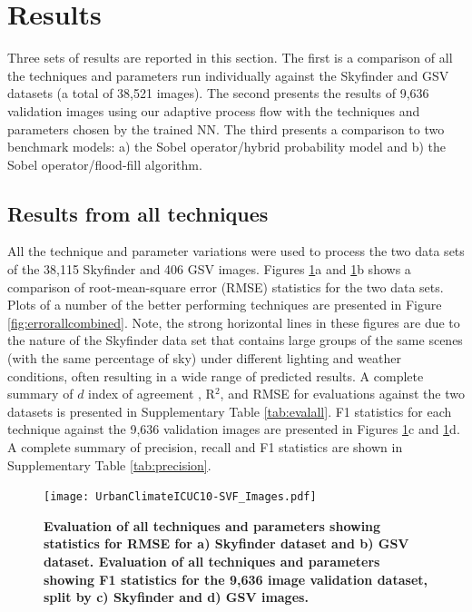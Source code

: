 \documentclass[final,3p,times,authoryear]{elsarticle}
\begin{document}
\section{Results}\label{sec:results}


Three sets of results are reported in this section. The first is a comparison of all the techniques and parameters run individually against the Skyfinder and GSV datasets (a total of 38,521 images). The second presents the results of 9,636 validation images using our adaptive process flow with the techniques and parameters chosen by the trained NN. The third presents a comparison to two benchmark models: a) the \cite{Wang2015a} Sobel operator/hybrid probability model and b) the \cite{Middel2018} Sobel operator/flood-fill algorithm.

\subsection{Results from all techniques}\label{sec:resultsall}
All the technique and parameter variations were used to process the two data sets of the 38,115 Skyfinder and 406 GSV images. Figures \ref{fig:stats}a and \ref{fig:stats}b shows a comparison of root-mean-square error (RMSE) statistics for the two data sets. Plots of a number of the better performing techniques are presented in Figure \ref{fig:errorallcombined}. Note, the strong horizontal lines in these figures are due to the nature of the Skyfinder data set that contains large groups of the same scenes (with the same percentage of sky) under different lighting and weather conditions, often resulting in a wide range of predicted results. A complete summary of $d$ index of agreement \citep{Willmott1981}, R$^{2}$, and RMSE for evaluations against the two datasets is presented in Supplementary Table \ref{tab:evalall}. F1 statistics for each technique against the 9,636 validation images are presented in Figures \ref{fig:stats}c and \ref{fig:stats}d. A complete summary of precision, recall and F1 statistics are shown in Supplementary Table \ref{tab:precision}.

\begin{figure}
\centering
\texttt{[image: UrbanClimateICUC10-SVF\_Images.pdf]} 
\caption{\textbf{
Evaluation of all techniques and parameters showing statistics for RMSE for a) Skyfinder dataset and b) GSV dataset. Evaluation of all techniques and parameters showing F1 statistics for the 9,636 image validation dataset, split by c) Skyfinder and d) GSV images.}}
\label{fig:stats}
\end{figure}
\end{document}
